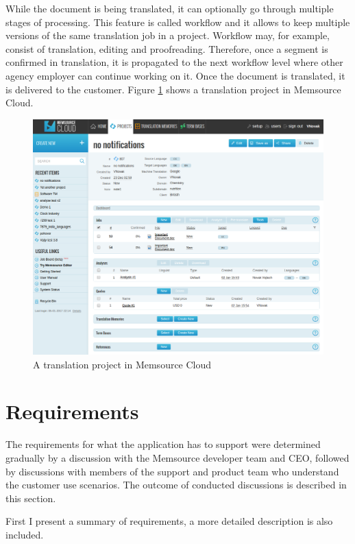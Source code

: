 While the document is being translated, it can optionally go through multiple stages of processing. This feature is called workflow and it allows to keep multiple versions of the same translation job in a project. Workflow may, for example, consist of translation, editing and proofreading. Therefore, once a segment is confirmed in translation, it is propagated to the next workflow level where other agency employer can continue working on it. Once the document is translated, it is delivered to the customer. Figure \ref{fig:cloud} shows a translation project in Memsource Cloud.

\begin{figure}[]
	\includegraphics[width=1\textwidth]{pics/cloud/project}
	\caption{A translation project in Memsource Cloud}
	\label{fig:cloud}
\end{figure}

\section{Requirements}

The requirements for what the application has to support were determined gradually by a discussion with the Memsource developer team and CEO, followed by discussions with members of the support and product team who understand the customer use scenarios.
The outcome of conducted discussions is described in this section.

First I present a summary of requirements, a more detailed description is also included.

